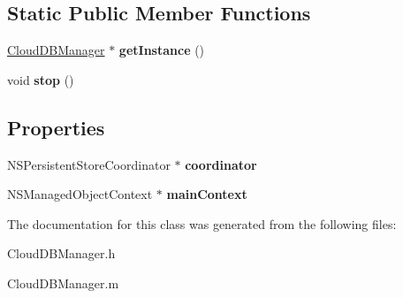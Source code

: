 \subsection*{\-Static \-Public \-Member \-Functions}
\begin{DoxyCompactItemize}
\item 
\hypertarget{interface_cloud_d_b_manager_a53b92ff0a2cc27e6185d08a7137fd260}{
\hyperlink{interface_cloud_d_b_manager}{\-Cloud\-D\-B\-Manager} $\ast$ {\bfseries get\-Instance} ()}
\label{interface_cloud_d_b_manager_a53b92ff0a2cc27e6185d08a7137fd260}

\item 
\hypertarget{interface_cloud_d_b_manager_a2801eda75d1a0b653d16fab81e7076b2}{
void {\bfseries stop} ()}
\label{interface_cloud_d_b_manager_a2801eda75d1a0b653d16fab81e7076b2}

\end{DoxyCompactItemize}
\subsection*{\-Properties}
\begin{DoxyCompactItemize}
\item 
\hypertarget{interface_cloud_d_b_manager_ae746e4050924c592224c40ad70de04c5}{
\-N\-S\-Persistent\-Store\-Coordinator $\ast$ {\bfseries coordinator}}
\label{interface_cloud_d_b_manager_ae746e4050924c592224c40ad70de04c5}

\item 
\hypertarget{interface_cloud_d_b_manager_a9c6d73a6c2cf4a6adb6235779cbc4aac}{
\-N\-S\-Managed\-Object\-Context $\ast$ {\bfseries main\-Context}}
\label{interface_cloud_d_b_manager_a9c6d73a6c2cf4a6adb6235779cbc4aac}

\end{DoxyCompactItemize}


\-The documentation for this class was generated from the following files\-:\begin{DoxyCompactItemize}
\item 
\-Cloud\-D\-B\-Manager.\-h\item 
\-Cloud\-D\-B\-Manager.\-m\end{DoxyCompactItemize}
